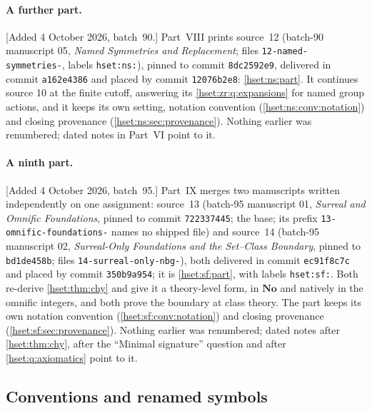 \documentclass[11pt,letterpaper]{article}
\theoremstyle{definition}
\theoremstyle{remark}
\newcommand{\No}{\mathbf{No}}
\begin{document}
\paragraph{A further part.} [Added 4 October 2026, batch~90.] Part~VIII prints
source~12 (batch-90 manuscript 05, \emph{Named Symmetries and Replacement};
files \texttt{12-named-symmetries-}, labels \texttt{hset:ns:}), pinned to commit
\texttt{8dc2592e9}, delivered in commit \texttt{a162e4386} and placed by commit
\texttt{12076b2e8}: \cref{hset:ns:part}. It continues source 10 at the finite
cutoff, answering its \cref{hset:zr:q:expansions} for named group actions, and
it keeps its own setting, notation convention (\cref{hset:ns:conv:notation}) and
closing provenance (\cref{hset:ns:sec:provenance}). Nothing earlier was
renumbered; dated notes in Part~VI point to it.

\paragraph{A ninth part.} [Added 4 October 2026, batch~95.] Part~IX merges two
manuscripts written independently on one assignment: source~13 (batch-95
manuscript 01, \emph{Surreal and Omnific Foundations}, pinned to commit
\texttt{722337445}; the base; its prefix \texttt{13-omnific-foundations-} names no
shipped file) and source~14 (batch-95 manuscript 02, \emph{Surreal-Only
Foundations and the Set--Class Boundary}, pinned to \texttt{bd1de458b}; files
\texttt{14-surreal-only-nbg-}), both delivered in commit \texttt{ec91f8c7c} and
placed by commit \texttt{350b9a954}; it is \cref{hset:sf:part}, with labels
\texttt{hset:sf:}.
Both re-derive \cref{hset:thm:chy} and give it a theory-level form, in $\No$ and
natively in the omnific integers, and both prove the boundary at class theory. The
part keeps its own notation convention (\cref{hset:sf:conv:notation}) and closing
provenance (\cref{hset:sf:sec:provenance}). Nothing earlier was renumbered; dated
notes after \cref{hset:thm:chy}, after the ``Minimal signature'' question and after
\cref{hset:q:axiomatics} point to it.
\subsection{Conventions and renamed symbols}
\label{hset:sub:conventions}
\end{document}
